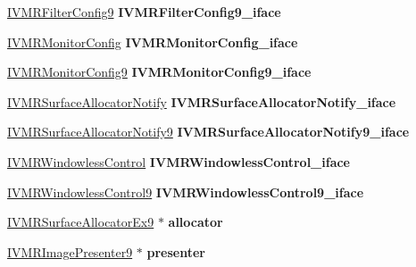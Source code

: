 \begin{DoxyCompactItemize}
\hyperlink{interface_i_v_m_r_filter_config9}{I\+V\+M\+R\+Filter\+Config9} {\bfseries I\+V\+M\+R\+Filter\+Config9\+\_\+iface}
\item 
\mbox{\label{structquartz__vmr_aa5c4cf8f79dc5b834af856fa62b6529b}} 
\hyperlink{interface_i_v_m_r_monitor_config}{I\+V\+M\+R\+Monitor\+Config} {\bfseries I\+V\+M\+R\+Monitor\+Config\+\_\+iface}
\item 
\mbox{\label{structquartz__vmr_ad53c682cb2b6d5e7596e9c7198570bf5}} 
\hyperlink{interface_i_v_m_r_monitor_config9}{I\+V\+M\+R\+Monitor\+Config9} {\bfseries I\+V\+M\+R\+Monitor\+Config9\+\_\+iface}
\item 
\mbox{\label{structquartz__vmr_a7e6780e2af8a782a301610ef18c2843f}} 
\hyperlink{interface_i_v_m_r_surface_allocator_notify}{I\+V\+M\+R\+Surface\+Allocator\+Notify} {\bfseries I\+V\+M\+R\+Surface\+Allocator\+Notify\+\_\+iface}
\item 
\mbox{\label{structquartz__vmr_ad04f23cecd17d6b2670fcd56107a7f33}} 
\hyperlink{interface_i_v_m_r_surface_allocator_notify9}{I\+V\+M\+R\+Surface\+Allocator\+Notify9} {\bfseries I\+V\+M\+R\+Surface\+Allocator\+Notify9\+\_\+iface}
\item 
\mbox{\label{structquartz__vmr_a023956759131b4d173a0a0765296e1a6}} 
\hyperlink{interface_i_v_m_r_windowless_control}{I\+V\+M\+R\+Windowless\+Control} {\bfseries I\+V\+M\+R\+Windowless\+Control\+\_\+iface}
\item 
\mbox{\label{structquartz__vmr_a64bb9467da5a45cdaacc17a02c56b4b6}} 
\hyperlink{interface_i_v_m_r_windowless_control9}{I\+V\+M\+R\+Windowless\+Control9} {\bfseries I\+V\+M\+R\+Windowless\+Control9\+\_\+iface}
\item 
\mbox{\label{structquartz__vmr_a318f5dd0a881710481c86fbbd84f0bd7}} 
\hyperlink{interface_i_v_m_r_surface_allocator_ex9}{I\+V\+M\+R\+Surface\+Allocator\+Ex9} $\ast$ {\bfseries allocator}
\item 
\mbox{\label{structquartz__vmr_a1b6c4489d5a4bc544c0b2201730dde50}} 
\hyperlink{interface_i_v_m_r_image_presenter9}{I\+V\+M\+R\+Image\+Presenter9} $\ast$ {\bfseries presenter}

\end{DoxyCompactItemize}
